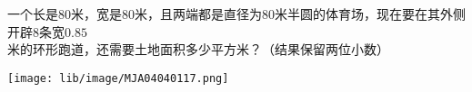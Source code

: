 一个长是$80$米，宽是$80$米，且两端都是直径为$80$米半圆的体育场，现在要在其外侧开辟$8$条宽$0.85$米的环形跑道，还需要土地面积多少平方米？（结果保留两位小数）

\begin{center}
    \texttt{[image: lib/image/MJA04040117.png]}
\end{center}